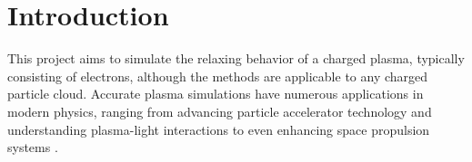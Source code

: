 \section{Introduction}




This project aims to simulate the relaxing behavior of a charged plasma, typically consisting of electrons, although the methods are applicable to any charged particle cloud. Accurate plasma simulations have numerous applications in modern physics, ranging from advancing particle accelerator technology and understanding plasma-light interactions to even enhancing space propulsion systems \cite{wikipedia_plasma_propulsion}.

